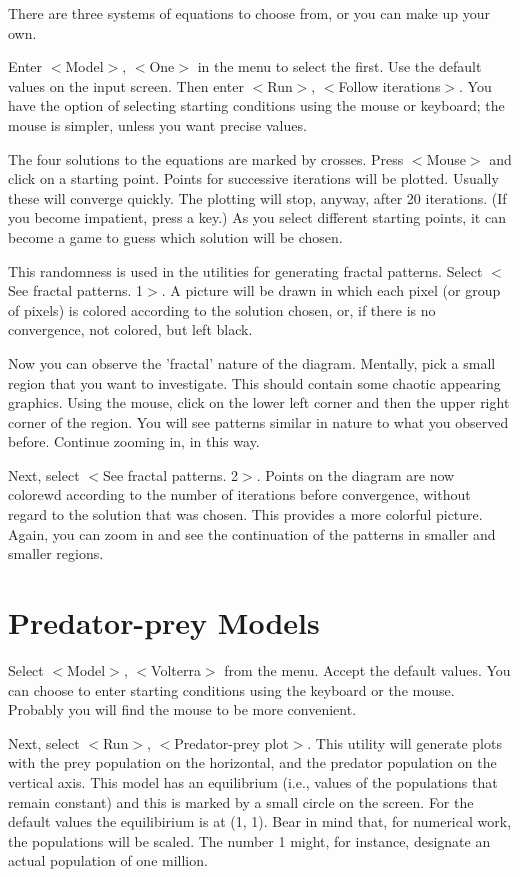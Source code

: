    There are three systems of equations to choose from, or you can
make up your own.

   Enter $<$Model$>$, $<$One$>$ in the menu to select the first. Use the
default values on the input screen. Then enter $<$Run$>$, $<$Follow
iterations$>$. You have the option of selecting starting conditions
using the mouse or keyboard; the mouse is simpler, unless you want
precise values.

   The four solutions to the equations are marked by crosses. Press
$<$Mouse$>$ and click on a starting point. Points for successive iterations
will be plotted. Usually these will converge quickly. The plotting will
stop, anyway, after 20 iterations. (If you become impatient, press a key.)
As you select different starting points, it can become a game to guess
which solution will be chosen.

   This randomness is used in the utilities for generating fractal
patterns. Select $<$See fractal patterns. 1$>$. A picture will be drawn
in which each pixel (or group of pixels) is colored according to the
solution chosen, or, if there is no convergence, not colored, but
left black.

   Now you can observe the 'fractal' nature of the diagram. Mentally,
pick a small region that you want to investigate. This should contain
some chaotic appearing graphics. Using the mouse, click on the lower
left corner and then the upper right corner of the region. You will
see patterns similar in nature to what you observed before. Continue
zooming in, in this way.

   Next, select $<$See fractal patterns. 2$>$. Points on the diagram are
now colorewd according to the number of iterations before convergence,
without regard to the solution that was chosen. This provides a more
colorful picture. Again, you can zoom in and see the continuation of
the patterns in smaller and smaller regions.


\section{Predator-prey Models}

   Select $<$Model$>$, $<$Volterra$>$ from the menu. Accept the default values.
You can choose to enter starting conditions using the keyboard or the
mouse. Probably you will find the mouse to be more convenient.

   Next, select $<$Run$>$, $<$Predator-prey plot$>$. This utility will generate
plots with the prey population on the horizontal, and the predator
population on the vertical axis. This model has an equilibrium (i.e.,
values of the populations that remain constant) and this is marked by
a small circle on the screen. For the default values the equilibirium
is at (1, 1). Bear in mind that, for numerical work, the populations
will be scaled. The number 1 might, for instance, designate an actual
population of one million.

